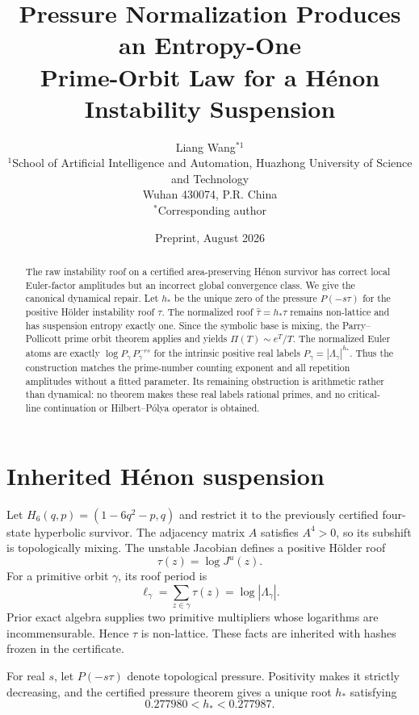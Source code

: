 \documentclass[11pt]{article}
\title{Pressure Normalization Produces an Entropy-One\\Prime-Orbit Law for a H\'enon Instability Suspension}
\author{Liang Wang$^{*1}$\\
\small $^{1}$School of Artificial Intelligence and Automation, Huazhong University of Science and Technology\\
\small Wuhan 430074, P.R. China\\
\small $^*$Corresponding author}
\date{Preprint, August 2026}
\theoremstyle{remark}\newtheorem{remark}[theorem]{Remark}
\begin{document}
\maketitle
\begin{abstract}
The raw instability roof on a certified area-preserving H\'enon survivor has
correct local Euler-factor amplitudes but an incorrect global convergence
class.  We give the canonical dynamical repair.  Let $h_*$ be the unique zero
of the pressure $P(-s\tau)$ for the positive H\"older instability roof
$\tau$.  The normalized roof $\widehat\tau=h_*\tau$ remains non-lattice and
has suspension entropy exactly one.  Since the symbolic base is mixing, the
Parry--Pollicott prime orbit theorem applies and yields
$\Pi(T)\sim e^T/T$.  The normalized Euler atoms are exactly
$\log P_\gamma\,P_\gamma^{-rs}$ for the intrinsic positive real labels
$P_\gamma=|\Lambda_\gamma|^{h_*}$.  Thus the construction matches the
prime-number counting exponent and all repetition amplitudes without a
fitted parameter.  Its remaining obstruction is arithmetic rather than
dynamical: no theorem makes these real labels rational primes, and no
critical-line continuation or Hilbert--P\'olya operator is obtained.
\end{abstract}

\section{Inherited H\'enon suspension}
Let $H_6(q,p)=(1-6q^2-p,q)$ and restrict it to the previously certified
four-state hyperbolic survivor.  The adjacency matrix $A$ satisfies $A^4>0$,
so its subshift is topologically mixing.  The unstable Jacobian defines a
positive H\"older roof
\[
\tau(z)=\log J^u(z).
\]
For a primitive orbit $\gamma$, its roof period is
\[
\ell_\gamma=\sum_{z\in\gamma}\tau(z)=\log|\Lambda_\gamma|.
\]
Prior exact algebra supplies two primitive multipliers whose logarithms are
incommensurable.  Hence $\tau$ is non-lattice.  These facts are inherited
with hashes frozen in the certificate.

For real $s$, let $P(-s\tau)$ denote topological pressure.  Positivity makes
it strictly decreasing, and the certified pressure theorem gives a unique
root $h_*$ satisfying
\begin{equation}\label{eq:hinterval}
0.277980<h_*<0.277987.
\end{equation}
\end{document}
